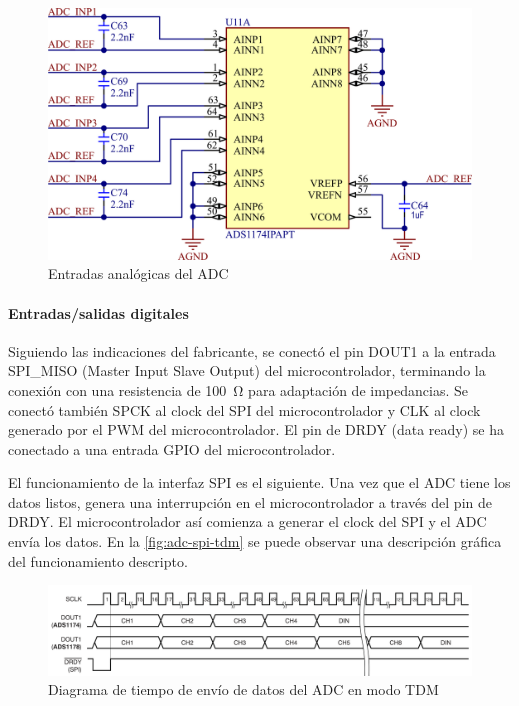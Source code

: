 \documentclass[titlepage, 12pt]{article}
\begin{document}
    \begin{figure}[!htbp]
        \centering
        \includegraphics[scale=1.5]{images/adc-inputs.png}
        \caption{Entradas analógicas del ADC}
        \label{fig:adc-inputs}
    \end{figure}

\paragraph{Entradas/salidas digitales}
Siguiendo las indicaciones del fabricante, se conectó el pin DOUT1 a la entrada SPI\_MISO (Master Input Slave Output) del microcontrolador, terminando la conexión con una resistencia de \SI{100}{\ohm} para adaptación de impedancias. Se conectó también SPCK al clock del SPI del microcontrolador y CLK al clock generado por el PWM del microcontrolador. El pin de DRDY (data ready) se ha conectado a una entrada GPIO del microcontrolador.

El funcionamiento de la interfaz SPI es el siguiente. Una vez que el ADC tiene los datos listos, genera una interrupción en el microcontrolador a través del pin de DRDY. El microcontrolador así comienza a generar el clock del SPI y el ADC envía los datos. En la \autoref{fig:adc-spi-tdm} se puede observar una descripción gráfica del funcionamiento descripto.

    \begin{figure}[!htbp]
        \centering
        \includegraphics[scale=0.4]{images/adc-spi-tdm.png}
        \caption{Diagrama de tiempo de envío de datos del ADC en modo TDM}
        \label{fig:adc-spi-tdm}
    \end{figure}
\end{document}
